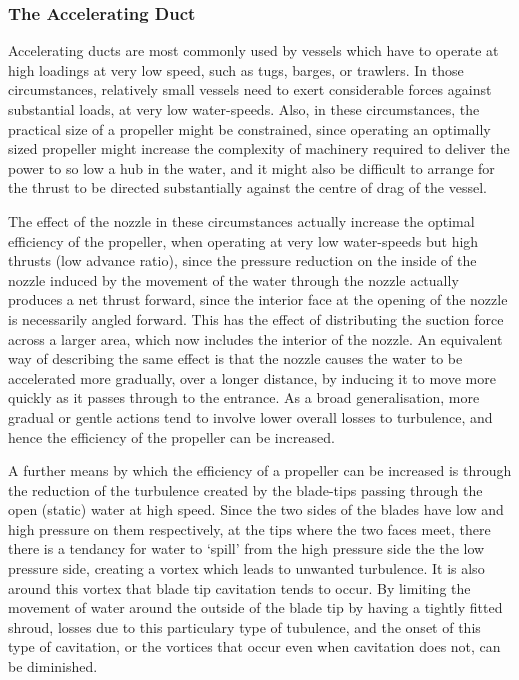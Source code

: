 \documentclass{article}\usepackage[]{graphicx}\usepackage[]{color}
\begin{document}
\subsubsection{The Accelerating Duct}
Accelerating ducts are most commonly used by vessels which have to operate at high loadings at very low speed, such as tugs, barges, or trawlers.  In those circumstances, relatively small vessels need to exert considerable forces against substantial loads, at very low water-speeds.  Also, in these circumstances, the practical size of a propeller might be constrained, since operating an optimally sized propeller might increase the complexity of machinery required to deliver the power to so low a hub in the water, and it might also be difficult to arrange for the thrust to be directed substantially against the centre of drag of the vessel.

The effect of the nozzle in these circumstances actually increase the optimal efficiency of the propeller, when operating at very low water-speeds but high thrusts (low advance ratio), since the pressure reduction on the inside of the nozzle induced by the movement of the water through the nozzle actually produces a net thrust forward, since the interior face at the opening of the nozzle is necessarily angled forward. This has the effect of distributing the suction force across a larger area, which now includes the interior of the nozzle.  An equivalent way of describing the same effect is that the nozzle causes the water to be accelerated more gradually, over a longer distance, by inducing it to move more quickly as it passes through to the entrance.  As a broad generalisation, more gradual or gentle actions tend to involve lower overall losses to turbulence, and hence the efficiency of the propeller can be increased.

A further means by which the efficiency of a propeller can be increased is through the reduction of the turbulence created by the blade-tips passing through the open (static) water at high speed.  Since the two sides of the blades have low and high pressure on them respectively, at the tips where the two faces meet, there there is a tendancy for water to `spill' from the high pressure side the the low pressure side, creating a vortex which leads to unwanted turbulence.  It is also around this vortex that blade tip cavitation tends to occur. By limiting the movement of water around the outside of the blade tip by having a tightly fitted shroud, losses due to this particulary type of tubulence, and the onset of this type of cavitation, or the vortices that occur even when cavitation does not, can be diminished.
\end{document}
